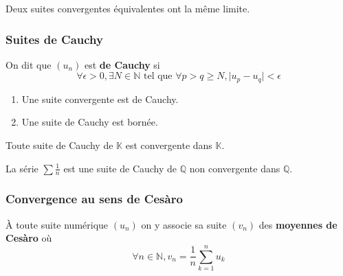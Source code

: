 
  \begin{proposition}
    Deux suites convergentes équivalentes ont la même limite.
  \end{proposition}

  \subsubsection{Suites de Cauchy}


  \begin{definition}
    On dit que $(u_n)$ est \textbf{de Cauchy} si
    \[ \forall \epsilon > 0, \exists N \in \mathbb{N} \text{ tel que } \forall p > q \geq N, \vert u_p - u_q \vert < \epsilon \]
  \end{definition}

  \begin{proposition}
    \begin{enumerate}[label=(\roman*)]
      \item Une suite convergente est de Cauchy.
      \item Une suite de Cauchy est bornée.
    \end{enumerate}
  \end{proposition}

  \begin{theorem}
    Toute suite de Cauchy de $\mathbb{K}$ est convergente dans $\mathbb{K}$.
  \end{theorem}


  \begin{cexample}
    La série $\sum \frac{1}{n}$ est une suite de Cauchy de $\mathbb{Q}$ non convergente dans $\mathbb{Q}$.
  \end{cexample}

  \subsubsection{Convergence au sens de Cesàro}


  \begin{definition}
    À toute suite numérique $(u_n)$ on y associe sa suite $(v_n)$ des \textbf{moyennes de Cesàro} où
    \[ \forall n \in \mathbb{N}, v_n = \frac{1}{n} \sum_{k=1}^{n} u_k \]
  \end{definition}

